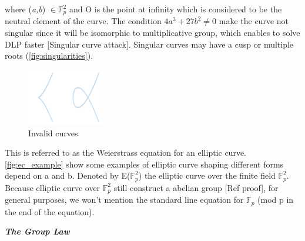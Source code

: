 where (\emph{a,b}) $\in\mathbb{F}_{p}^2$ and O is the point at infinity which is considered to be the neutral element of the curve. The condition $4a^3 + 27b^2 \neq 0$ make the curve not singular since it will be isomorphic to multiplicative group, which enables to solve DLP faster [Singular curve attack]. Singular curves may have a cusp or multiple roots (\autoref{fig:singularities}).

\begin{figure}[ht!]
  \centering
  \includegraphics[width=0.3\textwidth]{images/singularities.png}
  \caption[Invalid curves]{Invalid curves}
  \label{fig:singularities}
\end{figure}

This is referred to as the Weierstrass equation for an elliptic curve.
\autoref{fig:ec_example} show some examples of elliptic curve shaping different forms depend on a and b.
Denoted by E($\mathbb{F}_{p}^2$) the elliptic curve over the finite field $\mathbb{F}_{p}^2$.
Because elliptic curve over $\mathbb{F}_{p}^2$ still construct a abelian group [Ref proof], for general purposes, we won't mention the standard line equation for $\mathbb{F}_{p}$ (mod p in the end of the equation).


{\textit {\textbf{The Group Law}}}

